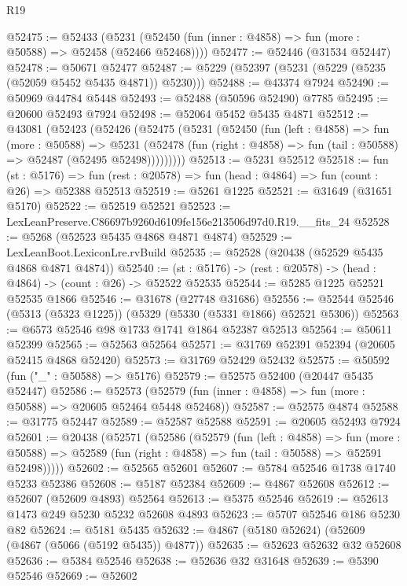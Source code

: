 \begin{lexlean}{R19}
\begin{coremodule}
@52475 := @52433
    (@5231 (@52450 (fun (inner : @4858) => fun (more : @50588) => @52458 (@52466 @52468))))
@52477 := @52446 (@31534 @52447)
@52478 := @50671 @52477
@52487 := @5229 (@52397 (@5231 (@5229 (@5235 (@52059 @5452 @5435 @4871)) @5230)))
@52488 := @43374 @7924
@52490 := @50969 @44784 @5448
@52493 := @52488 (@50596 @52490) @7785
@52495 := @20600 @52493 @7924
@52498 := @52064 @5452 @5435 @4871
@52512 := @43081
    (@52423
      (@52426
        (@52475
          (@5231
            (@52450
              (fun (left : @4858) =>
              fun (more : @50588) =>
              @5231
                (@52478
                  (fun (right : @4858) => fun (tail : @50588) => @52487 (@52495 @52498)))))))))
@52513 := @5231 @52512
@52518 := fun (st : @5176) =>
  fun (rest : @20578) => fun (head : @4864) => fun (count : @26) => @52388 @52513
@52519 := @5261 @1225
@52521 := @31649 (@31651 @5170)
@52522 := @52519 @52521
@52523 := LexLeanPreserve.C86697b9260d6109fe156e213506d97d0.R19.__fits_24
@52528 := @5268 (@52523 @5435 @4868 @4871 @4874)
@52529 := LexLeanBoot.LexiconLre.rvBuild
@52535 := @52528 (@20438 (@52529 @5435 @4868 @4871 @4874))
@52540 := (st : @5176) -> (rest : @20578) -> (head : @4864) -> (count : @26) -> @52522 @52535
@52544 := @5285 @1225 @52521 @52535 @1866
@52546 := @31678 (@27748 @31686)
@52556 := @52544 @52546 (@5313 (@5323 @1225)) (@5329 (@5330 (@5331 @1866) @52521 @5306))
@52563 := @6573 @52546 @98 @1733 @1741 @1864 @52387 @52513
@52564 := @50611 @52399
@52565 := @52563 @52564
@52571 := @31769 @52391 @52394 (@20605 @52415 @4868 @52420)
@52573 := @31769 @52429 @52432
@52575 := @50592 (fun ("_" : @50588) => @5176)
@52579 := @52575 @52400 (@20447 @5435 @52447)
@52586 := @52573 (@52579 (fun (inner : @4858) => fun (more : @50588) => @20605 @52464 @5448 @52468))
@52587 := @52575 @4874
@52588 := @31775 @52447
@52589 := @52587 @52588
@52591 := @20605 @52493 @7924
@52601 := @20438
    (@52571
      (@52586
        (@52579
          (fun (left : @4858) =>
          fun (more : @50588) =>
          @52589 (fun (right : @4858) => fun (tail : @50588) => @52591 @52498)))))
@52602 := @52565 @52601
@52607 := @5784 @52546 @1738 @1740 @5233 @52386
@52608 := @5187 @52384
@52609 := @4867 @52608
@52612 := @52607 (@52609 @4893) @52564
@52613 := @5375 @52546
@52619 := @52613 @1473 @249 @5230 @5232 @52608 @4893
@52623 := @5707 @52546 @186 @5230 @82
@52624 := @5181 @5435
@52632 := @4867 (@5180 @52624) (@52609 (@4867 (@5066 (@5192 @5435)) @4877))
@52635 := @52623 @52632 @32 @52608
@52636 := @5384 @52546
@52638 := @52636 @32 @31648
@52639 := @5390 @52546
@52669 := @52602

\end{coremodule}
\end{lexlean}
